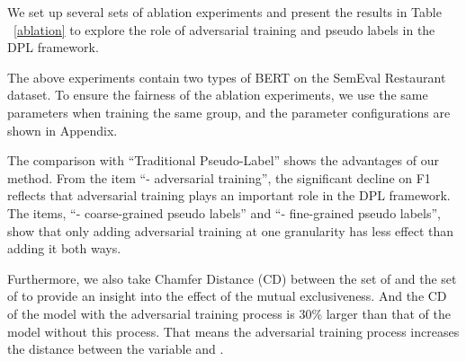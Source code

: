 \documentclass[11pt]{article}
\begin{document}
We set up several sets of ablation experiments and present the results in Table ~\ref{ablation} to explore the role of adversarial training and pseudo labels in the DPL framework.

The above experiments contain two types of BERT on the SemEval Restaurant dataset. To ensure the fairness of the ablation experiments, we use the same parameters when training the same group, and the parameter configurations are shown in Appendix.

The comparison with ``Traditional Pseudo-Label'' shows the advantages of our method.
From the item ``- adversarial training'', the significant decline on F1 reflects that adversarial training plays an important role in the DPL framework. 
The items, ``- coarse-grained pseudo labels'' and ``- fine-grained pseudo labels'', show that only adding adversarial training at one granularity has less effect than adding it both ways.

Furthermore, we also take Chamfer Distance (CD) between the set of  and the set of  to provide an insight into the effect of the mutual exclusiveness. 
And the CD of the model with the adversarial training process is 30\% larger than that of the model without this process.
That means the adversarial training process increases the distance between the variable  and .
\end{document}

